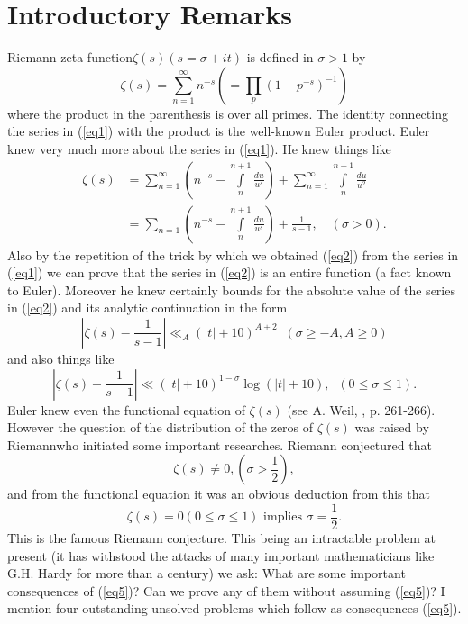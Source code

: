 \chapter*{Introductory Remarks}

Riemann zeta-function\pageoriginale $\zeta(s) (s = \sigma + it)$ is defined in $\sigma >1$ by
\begin{equation*}
\zeta(s) = \sum\limits^\infty_{n=1} n^{-s} \left( = \prod\limits_p (1-p^{-s})^{-1} \right) \tag{1} \label{eq1}
\end{equation*}
where the product in the parenthesis is over all primes. The identity connecting the series in (\ref{eq1}) with the product is the well-known Euler product. Euler knew very much more about the series in (\ref{eq1}). He knew things like
\begin{align*}
\zeta(s) & = \sum\limits^{\infty}_{n=1} \left( n^{-s} - \int\limits^{n+1}_n \frac{du}{u^s}\right) + \sum\limits^\infty_{n=1} \int\limits^{n+1}_n \frac{du}{u^2} \\
& = \sum\limits_{n=1} \left(n^{-s} - \int\limits^{n+1}_n \frac{du}{u^s} \right) + \frac{1}{s-1}, \quad (\sigma > 0). \tag{2}\label{eq2}
 \end{align*}
Also by the repetition of the trick by which we obtained (\ref{eq2}) from the series in (\ref{eq1}) we can prove that the series in (\ref{eq2}) is an entire function (a fact known to Euler). Moreover he knew certainly bounds for the absolute value of the series in (\ref{eq2}) and its analytic continuation in the form
\begin{equation*}
|\zeta(s) - \frac{1}{s-1}| \ll_A (|t|+10)^{A+2} \;\;  (\sigma \geq -A, A \geq 0) 
\tag{3}\label{eq3}
\end{equation*}
and also things like
\begin{equation*}
|\zeta(s) -\frac{1}{s-1}| \ll (|t|+10)^{1-\sigma}\log (|t|+10), \; \; (0\leq \sigma \leq 1). \tag{4}\label{eq4}
\end{equation*}
Euler knew even the functional equation of $\zeta(s)$ (see A. Weil, \cite{Weil1}, p. 261-266). However the question of the distribution of the zeros of $\zeta(s)$ was raised by Riemann\pageoriginale who initiated some important researches. Riemann conjectured that
\begin{equation*}
\zeta (s) \neq 0, (\sigma > \frac{1}{2}), \tag{5}\label{eq5}
\end{equation*}
and from the functional equation it was an obvious deduction from this that
\begin{equation*}
\zeta(s) = 0 (0 \leq \sigma \leq 1) \text{ implies } \sigma = \frac{1}{2}. 
\tag{6}\label{eq6}
\end{equation*}
This is the famous Riemann conjecture. This being an intractable problem at present (it has withstood the attacks of many important mathematicians like G.H. Hardy for more than a century) we ask: What are some important consequences of (\ref{eq5})? Can we prove any of them without assuming (\ref{eq5})? I mention four outstanding unsolved problems which follow as consequences (\ref{eq5}).

